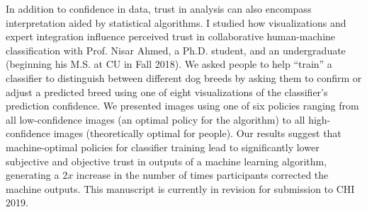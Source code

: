 \documentclass[11pt]{article}
\begin{document}
In addition to confidence in data, trust in analysis can also encompass interpretation aided by statistical algorithms. I studied how visualizations and expert integration influence perceived trust in collaborative human-machine classification with Prof. Nisar Ahmed, a Ph.D. student, and an undergraduate (beginning his M.S. at CU in Fall 2018). We asked people to help ``train'' a classifier to distinguish between different dog breeds by asking them to confirm or adjust a predicted breed using one of eight visualizations of the classifier's prediction confidence. We presented 
images using one of six policies ranging from all low-confidence images (an optimal policy for the algorithm) to all high-confidence images  (theoretically optimal for people). Our results suggest that machine-optimal policies for classifier training lead to significantly lower subjective and objective trust in outputs of a machine learning algorithm, generating a $2x$ increase in the number of times participants corrected the machine outputs. This manuscript is currently in revision for submission to CHI 2019. 



\end{document}
